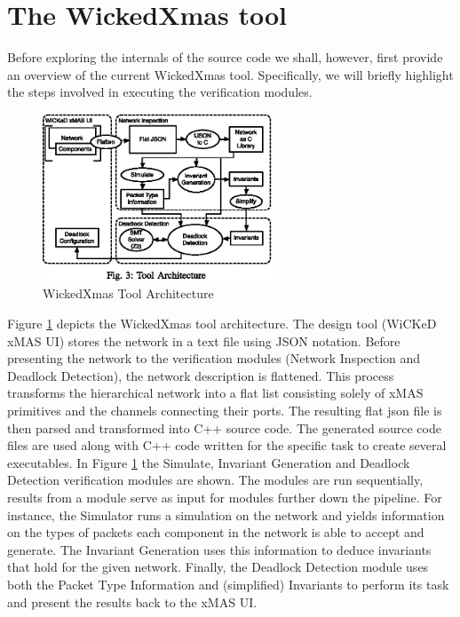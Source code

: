 \documentclass[a4paper,11pt]{article}
\begin{document}
\tableofcontents

\pagebreak

\section{The WickedXmas tool}


Before exploring the internals of the source code we shall, however, first provide an overview
of the current WickedXmas tool. Specifically, we will briefly highlight the steps involved in
executing the verification modules.

\begin{figure}[h]
  \includegraphics[height=5cm]{wickedxmas-arch.eps}
  \caption{WickedXmas Tool Architecture}
  \label{fig:wickedxmas-arch}
\end{figure}

Figure \ref{fig:wickedxmas-arch}\cite[p.~3]{13_toolxmas} depicts the WickedXmas tool architecture.
The design tool (WiCKeD xMAS UI) stores the network in a text file using JSON notation. Before
presenting the network to the verification modules (Network Inspection and Deadlock Detection),
the network description is flattened. This process transforms the hierarchical network into
a flat list consisting solely of xMAS primitives and the channels connecting their ports. The resulting
flat json file is then parsed and transformed into C++ source code. The generated source code files are
used along with C++ code written for the specific task to create several executables. In Figure
\ref{fig:wickedxmas-arch} the Simulate, Invariant Generation and Deadlock Detection verification modules
are shown. The modules are run sequentially, results from a module serve as input for modules further down
the pipeline. For instance, the Simulator runs a simulation on the network and yields information on the
types of packets each component in the network is able to accept and generate. The Invariant Generation
uses this information to deduce invariants that hold for the given network. Finally, the Deadlock Detection
module uses both the Packet Type Information and (simplified) Invariants to perform its task and present
the results back to the xMAS UI.
\end{document}
